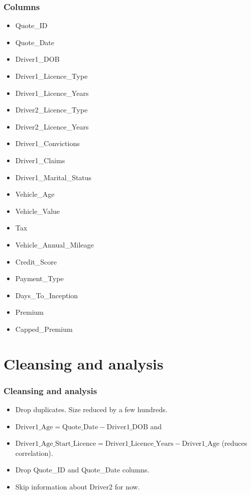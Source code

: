 \documentclass{beamer}
\theoremstyle{definition}
\begin{document}
\begin{frame}
\frametitle{Columns}
\begin{minipage}{0.5\linewidth}
\begin{itemize}
 \item Quote\_ID
\item Quote\_Date
\item Driver1\_DOB
\item Driver1\_Licence\_Type
\item Driver1\_Licence\_Years
\item Driver2\_Licence\_Type
\item Driver2\_Licence\_Years
\item Driver1\_Convictions
\item Driver1\_Claims
\item Driver1\_Marital\_Status
\end{itemize}
\end{minipage}
\begin{minipage}{0.45\linewidth}
\begin{itemize}
\item Vehicle\_Age
\item Vehicle\_Value
\item Tax
\item Vehicle\_Annual\_Mileage
\item Credit\_Score
\item Payment\_Type
\item Days\_To\_Inception
\item Premium
\item Capped\_Premium
\end{itemize}
\end{minipage}
\end{frame}

\section{Cleansing and analysis}
\begin{frame}
\frametitle{Cleansing and analysis}
\begin{itemize}
\item<1-> Drop duplicates. Size reduced by a few hundreds.
\item<2-> $\text{Driver1\_Age} = \text{Quote\_Date} - \text{Driver1\_DOB}$ and
\item<2-> $\text{Driver1\_Age\_Start\_Licence} = \text{Driver1\_Licence\_Years} - \text{Driver1\_Age}$ (reduces correlation).
\item<3-> Drop Quote\_ID and Quote\_Date columns. %
\item<4-> Skip information about Driver2 for now.
\end{itemize}
\end{frame}
\end{document}
